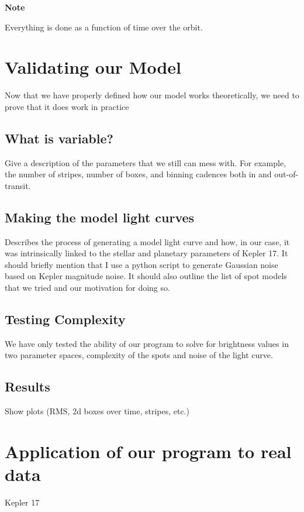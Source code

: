 \documentclass[iop]{emulateapj}
\begin{document}
\textbf{Note}

Everything is done as a function of time over the orbit.

\section{Validating our Model}
Now that we have properly defined how our model works theoretically, we need to prove that it does work in practice
\subsection{What is variable?}
	Give a description of the parameters that we still can mess with. For example, the number of stripes, number of boxes,  and binning cadences both in and out-of-transit.
\subsection{Making the model light curves}
	Describes the process of generating a model light curve and how, in our case, it was intrinsically linked to the stellar and planetary parameters of Kepler 17. It should briefly mention that I use a python script to generate Gaussian noise based on Kepler magnitude noise. It should also outline the list of spot models that we tried and our motivation for doing so.

\subsection{Testing Complexity}
We have only tested the ability of our program to solve for brightness values in two parameter spaces, complexity of the spots and noise of the light curve.

\subsection{Results}
Show plots (RMS, 2d boxes over time, stripes, etc.)

\section{Application of our program to real data}
Kepler 17
\end{document}
